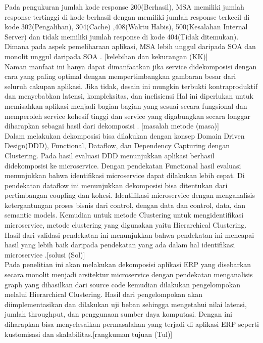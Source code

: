 Pada pengukuran jumlah kode response 200(Berhasil), MSA memiliki jumlah response tertinggi di kode berhasil dengan memiliki jumlah response terkecil di kode 302(Pengalihan), 304(Cache) ,408(Waktu Habis), 500(Kesalahan Internal Server) dan tidak memiliki jumlah response di kode 404(Tidak ditemukan). Dimana pada aspek pemeliharaan aplikasi, MSA lebih unggul daripada SOA dan monolit unggul daripada SOA \cite{4}. {\color{red}[kelebihan dan kekurangan (KK)]}\\ 

Naman manfaat ini hanya dapat dimanfaatkan jika service didekomposisi dengan cara yang paling optimal dengan mempertimbangkan gambaran besar dari seluruh cakupan aplikasi. Jika tidak, desain ini mungkin terbukti kontraproduktif dan menyebabkan latensi, kompleksitas, dan inefisiensi Hal ini diperlukan untuk memisahkan aplikasi menjadi bagian-bagian yang sesuai secara fungsional dan memperoleh service kohesif tinggi dan service yang digabungkan secara longgar diharapkan sebagai hasil dari dekomposisi \cite{3}. {\color{red}[masalah metode (masa)]}\\ 

Dalam melakukan dekomposisi bisa dilakukan dengan konsep Domain Driven Design(DDD), Functional, Dataflow, dan Dependency Capturing dengan Clustering. Pada hasil evaluasi DDD menunjukkan aplikasi berhasil didekomposisi ke microservice. Dengan pendekatan Functional hasil evaluasi menunjukkan bahwa identifikasi microservice dapat dilakukan lebih cepat. Di pendekatan dataflow ini menunjukkan dekomposisi bisa ditentukan dari pertimbangan coupling dan kohesi. Identifikasi microservice dengan menganalisis ketergantungan proses bisnis dari control, dengan data dan control, data, dan semantic models. Kemudian untuk metode Clustering untuk mengidentifikasi microservice, metode clustering yang digunakan yaitu Hierarchical Clustering. Hasil dari validasi pendekatan ini menunjukkan bahwa pendekatan ini mencapai hasil yang lebih baik daripada pendekatan yang ada dalam hal identifikasi microservice \cite{5}.{\color{red}[solusi (Sol)]}\\

Pada penelitian ini akan melakukan dekomposisi aplikasi ERP yang disebarkan secara monolit menjadi arsitektur microservice dengan pendekatan menganalisis graph yang dihasilkan dari source code kemudian dilakukan pengelompokan melalui Hierarchical Clustering. Hasil dari pengelompokan akan diimplementasikan dan dilakukan uji beban sehingga mengetahui nilai latensi, jumlah throughput, dan penggunaan sumber daya komputasi. Dengan ini diharapkan bisa menyelesaikan permasalahan yang terjadi di aplikasi ERP seperti kustomisasi dan skalabilitas.{\color{red}[rangkuman tujuan (Tul)]}\\ 

